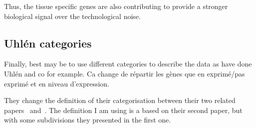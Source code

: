 Thus, the tissue specific genes are also contributing to provide a stronger
biological signal over the technological noise.

\subsection{Uhlén categories}\label{sub:UhlenGeneCat}

Finally, best may be to use different categories to describe the data as have
done Uhlén and co for example. Ca change de répartir les gènes que en exprimé/pas exprimé
et en niveau d'expression.

They change the definition of their categorisation
between their two related papers~ and~.
The definition I am using is a based on their second paper,
but with some subdivisions they presented in the first one.

